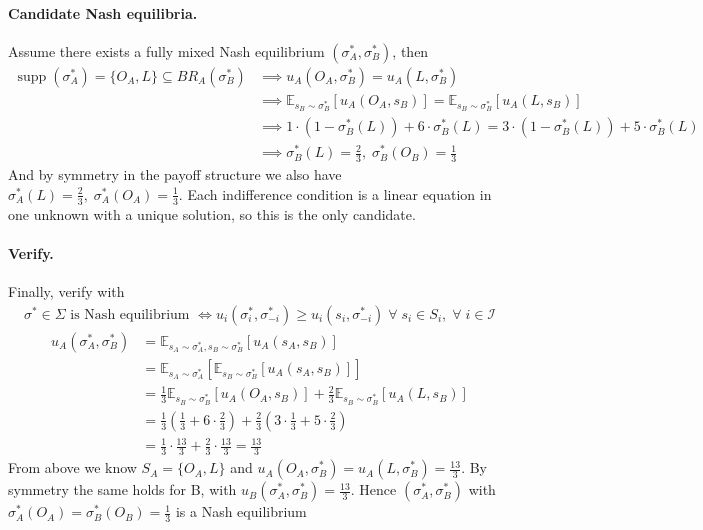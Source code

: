 \documentclass[11pt]{exam}
\begin{document}
\begin{questions}
\begin{parts}
        \paragraph{Candidate Nash equilibria.} Assume there exists a fully mixed Nash equilibrium $(\sigma_A^*, \sigma_B^*)$, then
        \begin{align*}
            \operatorname{supp}(\sigma^*_A) = \{O_A, L\} \subseteq BR_A(\sigma^*_B) 
            &\implies u_A(O_A, \sigma^*_B) = u_A(L, \sigma^*_B)\\
            &\implies \mathbb E_{s_B \sim \sigma_B^*}[u_A(O_A, s_B)] = \mathbb E_{s_B \sim \sigma_B^*}[u_A(L, s_B)]\\
            &\implies 1\cdot(1 - \sigma_B^*(L)) + 6\cdot\sigma_B^*(L) = 3\cdot(1 - \sigma_B^*(L)) + 5\cdot\sigma_B^*(L)\\
            &\implies \sigma^*_B(L) = \tfrac{2}{3},\; \sigma^*_B(O_B) = \tfrac{1}{3}
        \end{align*}
        And by symmetry in the payoff structure we also have $\sigma^*_A(L) = \tfrac{2}{3},\; \sigma^*_A(O_A) = \tfrac{1}{3}$. Each indifference condition is a linear equation in one unknown with a unique solution, so this is the only candidate.

        \paragraph{Verify.} Finally, verify with
        \begin{align*}
            \sigma^* \in \Sigma \text{ is Nash equilibrium } \iff u_i(\sigma_i^*, \sigma^*_{-i}) \geq u_i(s_i, \sigma^*_{-i})\; \forall\; s_i\in S_i,\;\forall\;i\in\mathcal I
        \end{align*}
        \begin{align*}
            u_A(\sigma_A^*, \sigma_B^*) &= 
            \mathbb E_{s_A\sim\sigma^*_A, s_B\sim\sigma^*_B}[u_A(s_A, s_B)]\\
            &= \mathbb E_{s_A\sim\sigma^*_A} \left[\mathbb E_{s_B\sim\sigma^*_B}[u_A(s_A, s_B)]\right] \tag{$\sigma_A^*$ independent from $\sigma_B^*$}\\
            &= \tfrac{1}{3}\mathbb E_{s_B\sim\sigma^*_B}[u_A(O_A, s_B)] + \tfrac{2}{3}\mathbb E_{s_B\sim\sigma^*_B}[u_A(L, s_B)]\\
            &= \tfrac{1}{3}(\tfrac{1}{3} + 6\cdot\tfrac{2}{3}) + \tfrac{2}{3}(3\cdot\tfrac{1}{3} + 5\cdot\tfrac{2}{3})\tag{plugging in from above}\\
            &= \tfrac{1}{3} \cdot \tfrac{13}{3} + \tfrac{2}{3}\cdot \tfrac{13}{3} = \tfrac{13}{3}
        \end{align*}
        From above we know $S_A = \{O_A, L\}$ and $u_A(O_A,\sigma^*_B) = u_A(L, \sigma^*_B) = \tfrac{13}{3}$. By symmetry the same holds for B, with $u_B(\sigma_A^*, \sigma_B^*) = \tfrac{13}{3}$. Hence $(\sigma_A^*, \sigma_B^*)$ with $\sigma^*_A(O_A) = \sigma^*_B(O_B) = \tfrac{1}{3}$ is a Nash equilibrium




\end{parts}
\end{questions}
\end{document}
